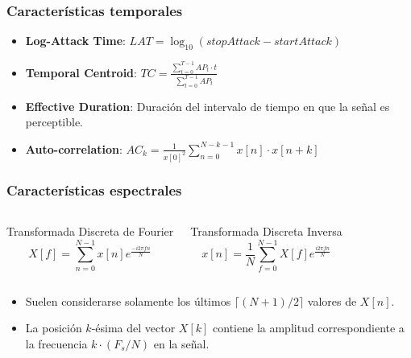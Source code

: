 \begin{frame}
    \frametitle{Características temporales}

    \begin{itemize}
        \item<1-> \textbf{Log-Attack Time}: $LAT = \log_{10}{(stopAttack - startAttack)}$
        \item<2-> \textbf{Temporal Centroid}: $TC = \frac{\sum_{t=0}^{T-1}{AP_t \cdot t}}{\sum_{t=0}^{T-1}{AP_t}}$
        \item<3-> \textbf{Effective Duration}: Duración del intervalo de tiempo en que la señal es perceptible.
        \item<4-> \textbf{Auto-correlation}: $AC_k = \frac{1}{x[0]^2}\sum_{n=0}^{N-k-1}{x[n]\cdot x[n+k]}$
    \end{itemize}

\end{frame}

\begin{frame}
    \frametitle{Características espectrales}

    \begin{columns}

        \begin{block}{Transformada Discreta de Fourier}
            \begin{equation*}
                X[f] = \sum_{n=0}^{N-1}{x[n]e^{\frac{-i2\pi fn}{N}}}
            \end{equation*}
        \end{block}


        \begin{block}{Transformada Discreta Inversa}
            \begin{equation*}
                x[n] = \frac{1}{N}\sum_{f=0}^{N-1}{X[f]e^{\frac{i2\pi fn}{N}}}
            \end{equation*}
        \end{block}
    \end{columns}

    \begin{itemize}
        \item<2-> Suelen considerarse solamente los últimos $\lceil (N+1)/2 \rceil$ valores de $X[n]$.
        \item<3-> La posición $k$-ésima del vector $X[k]$ contiene la amplitud correspondiente a la frecuencia $k\cdot(F_s/N)$ en la señal.
    \end{itemize}

\end{frame}

